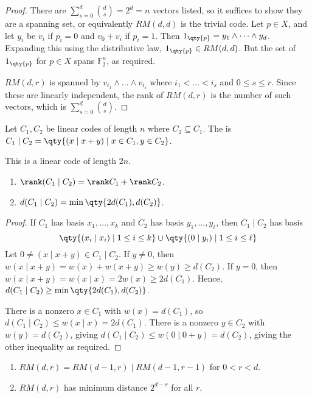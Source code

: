 \begin{proof}
    There are $\sum_{s=0}^d \binom{d}{s} = 2^d = n$ vectors listed, so it suffices to show they are a spanning set, or equivalently $RM(d,d)$ is the trivial code.
    Let $p \in X$, and let $y_i$ be $v_i$ if $p_i = 0$ and $v_0 + v_i$ if $p_i = 1$.
    Then $1_{\qty{p}} = y_1 \wedge \dots \wedge y_d$.
    Expanding this using the distributive law, $1_{\qty{p}} \in RM(d,d)$.
    But the set of $1_{\qty{p}}$ for $p \in X$ spans $\mathbb F_2^n$, as required.

    $RM(d,r)$ is spanned by $v_{i_1} \wedge \dots \wedge v_{i_s}$ where $i_1 < \dots < i_s$ and $0 \leq s \leq r$.
    Since these are linearly independent, the rank of $RM(d,r)$ is the number of such vectors, which is $\sum_{s=0}^d \binom{d}{s}$.
\end{proof}
\begin{definition}
    Let $C_1, C_2$ be linear codes of length $n$ where $C_2 \subseteq C_1$.
    The  is $C_1 \mid C_2 = \qty{(x \mid x + y) \mid x \in C_1, y \in C_2}$.
\end{definition}
This is a linear code of length $2n$.
\begin{lemma}
    \begin{enumerate}
        \item $\rank (C_1 \mid C_2) = \rank C_1 + \rank C_2$.
        \item $d(C_1 \mid C_2) = \min \qty{2d(C_1), d(C_2)}$.
    \end{enumerate}
\end{lemma}
\begin{proof}
    If $C_1$ has basis $x_1, \dots, x_k$ and $C_2$ has basis $y_1, \dots, y_\ell$, then $C_1 \mid C_2$ has basis
    \[ \qty{(x_i \mid x_i) \mid 1 \leq i \leq k} \cup \qty{(0 \mid y_i) \mid 1 \leq i \leq \ell} \]
    Let $0 \neq (x \mid x + y) \in C_1 \mid C_2$.
    If $y \neq 0$, then $w(x \mid x + y) = w(x) + w(x + y) \geq w(y) \geq d(C_2)$.
    If $y = 0$, then $w(x \mid x + y) = w(x \mid x) = 2w(x) \geq 2d(C_1)$.
    Hence, $d(C_1 \mid C_2) \geq \min\qty{2d(C_1), d(C_2)}$.

    There is a nonzero $x \in C_1$ with $w(x) = d(C_1)$, so $d(C_1 \mid C_2) \leq w(x \mid x) = 2d(C_1)$.
    There is a nonzero $y \in C_2$ with $w(y) = d(C_2)$, giving $d(C_1 \mid C_2) \leq w(0 \mid 0 + y) = d(C_2)$, giving the other inequality as required.
\end{proof}
\begin{theorem}
    \begin{enumerate}
        \item $RM(d,r) = RM(d-1,r) \mid RM(d-1,r-1)$ for $0 < r < d$.
        \item $RM(d,r)$ has minimum distance $2^{d-r}$ for all $r$.
    \end{enumerate}
\end{theorem}
